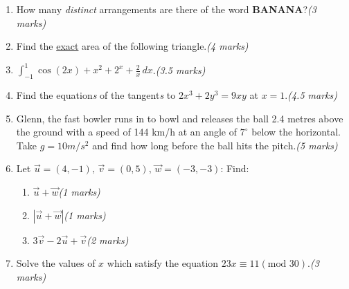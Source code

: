 \documentclass{article}
\begin{document}
\begin{enumerate}
\begin{enumerate}[label*=\arabic*.]
        \end{enumerate}
    \item How many \textit{distinct} arrangements are there of the word \textbf{BANANA}?\hfill{}\textit{(3 marks)}
    \item Find the \underline{exact} area of the following triangle.\hfill{}\textit{(4 marks)}
    \item $\int^1_{-1} \cos(2x) + x^2 + 2^x + \frac{2}{x}\, dx$.\hfill{}\textit{(3.5 marks)}
    \item Find the equation\textit{s} of the tangent\textit{s} to $2x^3 + 2y^3 = 9xy$ at $x = 1$.\hfill{}\textit{(4.5 marks)}
    \item Glenn, the fast bowler runs in to bowl and releases the ball 2.4 metres above the ground with a speed of 144 km/h at an angle of $7^\circ$ below the horizontal. Take $g = 10 m/s^2$ and find how long before the ball hits the pitch.\hfill{}\textit{(5 marks)}
    \item Let $\vec{u} = (4,-1), \, \vec{v} = (0,5), \, \vec{w} = (-3,-3)$:
        Find:
        \begin{enumerate}[label*=\arabic*.]
            \item $\vec{u} + \vec{w}$\hfill{}\textit{(1 marks)}
            \item $\left| \vec{u} + \vec{w} \right|$\hfill{}\textit{(1 marks)}
            \item $3\vec{v} - 2\vec{u} + \vec{v}$\hfill{}\textit{(2 marks)}
        \end{enumerate}
    \item Solve the values of $x$ which satisfy the equation $23x \equiv 11 (\text{mod }30)$.\hfill{}\textit{(3 marks)}
\end{enumerate}
\end{document}
